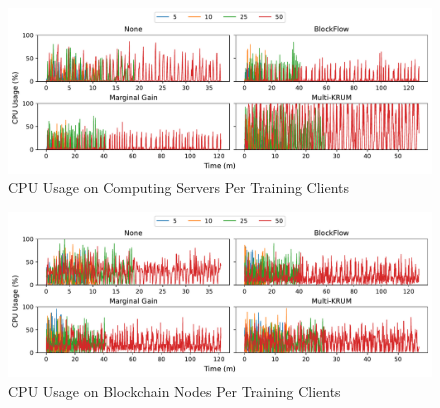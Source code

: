 \vfill

\begin{figure}[!h]
    \centering
    \includegraphics[width=\textwidth]{graphics/clients/cpu_server.pdf}
    \caption{CPU Usage on Computing Servers Per Training Clients}
    \label{fig:cpu_clients_servers}
\end{figure}

\vfill

\begin{figure}[!h]
    \centering
    \includegraphics[width=\textwidth]{graphics/clients/cpu_miner.pdf}
    \caption{CPU Usage on Blockchain Nodes Per Training Clients}
    \label{fig:cpu_clients_miners}
\end{figure}

